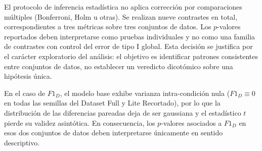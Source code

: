 \begin{obs}
	\label{obs:sin_correccion}
	El protocolo de inferencia estad\'istica no aplica correcci\'on por comparaciones m\'ultiples (Bonferroni, Holm u otras). Se realizan nueve contrastes en total, correspondientes a tres m\'etricas sobre tres conjuntos de datos. Los $p$-valores reportados deben interpretarse como pruebas individuales y no como una familia de contrastes con control del error de tipo I global. Esta decisi\'on se justifica por el car\'acter exploratorio del an\'alisis: el objetivo es identificar patrones consistentes entre conjuntos de datos, no establecer un veredicto dicot\'omico sobre una hip\'otesis \'unica.
\end{obs}

\begin{obs}
	\label{obs:f1d_varianza}
	En el caso de $F1_D$, el modelo base exhibe varianza intra-condici\'on nula ($F1_D \equiv 0$ en todas las semillas del Dataset Full y Lite Recortado), por lo que la distribuci\'on de las diferencias pareadas deja de ser gaussiana y el estad\'istico $t$ pierde su validez asint\'otica. En consecuencia, los $p$-valores asociados a $F1_D$ en esos dos conjuntos de datos deben interpretarse \'unicamente en sentido descriptivo.
\end{obs}